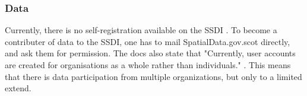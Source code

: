 \subsubsection{Data}
Currently, there is no self-registration available on the SSDI \citep{ssdi_documentation}. To become a contributer of data to the SSDI, one has to mail SpatialData.gov.scot directly, and ask them for permission. The docs also state that "Currently, user accounts are created for organisations as a whole rather than individuals." \citep{ssdi_documentation}. This means that there is data participation from multiple organizations, but only to a limited extend.

